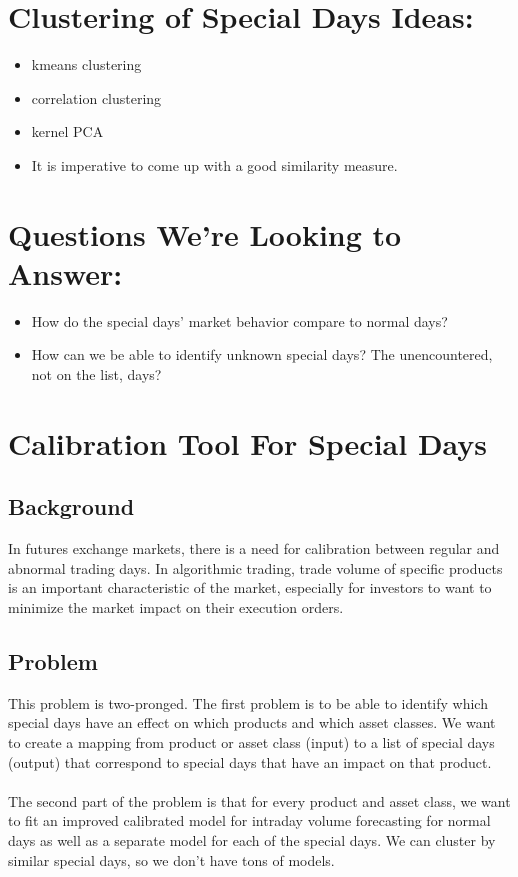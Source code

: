 \documentclass[11pt]{article}
\begin{document}
\section{Clustering of Special Days Ideas:}
\begin{itemize}
\setlength{\itemsep}{0pt}
  \setlength{\parskip}{0pt}
\item kmeans clustering
\item correlation clustering
\item kernel PCA
\item It is imperative to come up with a good similarity measure.
\end{itemize}

\section{Questions We're Looking to Answer:}
\begin{itemize}
\setlength{\itemsep}{0pt}
  \setlength{\parskip}{0pt}
\item How do the special days' market behavior compare to normal days?
\item How can we be able to identify unknown special days? The unencountered, not on the list, days?

\end{itemize}


\newpage

\section*{Calibration Tool For Special Days}
\subsection*{Background} 
In futures exchange markets, there is a need for calibration between regular and abnormal trading days. In algorithmic trading, trade volume of specific products is an important characteristic of the market, especially for investors to want to minimize the market impact on their execution orders.


\subsection*{Problem} 
This problem is two-pronged. The first problem is to be able to identify which special days have an effect on which products and which asset classes. We want to create a mapping from product or asset class (input) to a list of special days (output) that correspond to special days that have an impact on that product. 
\\\\The second part of the problem is that for every product and asset class, we want to fit an improved calibrated model for intraday volume forecasting for normal days as well as a separate model for each of the special days. We can cluster by similar special days, so we don't have tons of models. 
\end{document}
